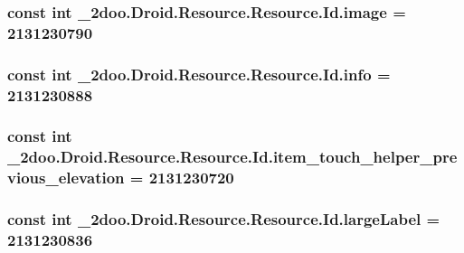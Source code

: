 \hypertarget{class__2doo_1_1_droid_1_1_resource_1_1_id_26a92b40ba9c38bd78e1ac401edd61e2}{
\subsubsection[{image}]{\setlength{\rightskip}{0pt plus 5cm}const int \_\-2doo.Droid.Resource.Resource.Id.image = 2131230790}}
\label{class__2doo_1_1_droid_1_1_resource_1_1_id_26a92b40ba9c38bd78e1ac401edd61e2}


\hypertarget{class__2doo_1_1_droid_1_1_resource_1_1_id_0f7758ac040b9807d4a7215c215cf303}{
\subsubsection[{info}]{\setlength{\rightskip}{0pt plus 5cm}const int \_\-2doo.Droid.Resource.Resource.Id.info = 2131230888}}
\label{class__2doo_1_1_droid_1_1_resource_1_1_id_0f7758ac040b9807d4a7215c215cf303}


\hypertarget{class__2doo_1_1_droid_1_1_resource_1_1_id_c5d9f3097ed859e11e64efa42656fff1}{
\subsubsection[{item\_\-touch\_\-helper\_\-previous\_\-elevation}]{\setlength{\rightskip}{0pt plus 5cm}const int \_\-2doo.Droid.Resource.Resource.Id.item\_\-touch\_\-helper\_\-previous\_\-elevation = 2131230720}}
\label{class__2doo_1_1_droid_1_1_resource_1_1_id_c5d9f3097ed859e11e64efa42656fff1}


\hypertarget{class__2doo_1_1_droid_1_1_resource_1_1_id_1ae8b98f0cd82ff24670b0916b4ceeca}{
\subsubsection[{largeLabel}]{\setlength{\rightskip}{0pt plus 5cm}const int \_\-2doo.Droid.Resource.Resource.Id.largeLabel = 2131230836}}
\label{class__2doo_1_1_droid_1_1_resource_1_1_id_1ae8b98f0cd82ff24670b0916b4ceeca}


